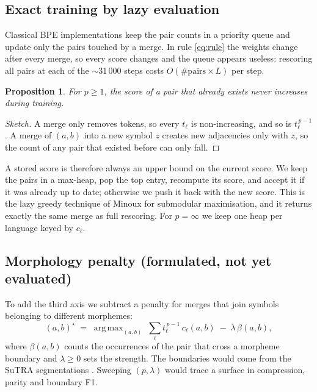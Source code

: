 \documentclass[11pt,a4paper]{article}
\newtheorem{proposition}{Proposition}
\theoremstyle{remark}
\DeclareMathOperator*{\argmax}{arg\,max}
\begin{document}
\subsection{Exact training by lazy evaluation}\label{sec:lazy}

Classical BPE implementations keep the pair counts in a priority queue and update only the
pairs touched by a merge. In rule \eqref{eq:rule} the weights change after every merge, so
every score changes and the queue appears useless: rescoring all pairs at each of the
$\sim$31\,000 steps costs $O(\#\text{pairs}\times L)$ per step.

\begin{proposition}\label{prop:lazy}
For $p\ge1$, the score of a pair that already exists never increases during training.
\end{proposition}

\begin{proof}[Sketch]
A merge only removes tokens, so every $t_\ell$ is non-increasing, and so is
$t_\ell^{\,p-1}$. A merge of $(a,b)$ into a new symbol $z$ creates new adjacencies only with
$z$, so the count of any pair that existed before can only fall.
\end{proof}

A stored score is therefore always an upper bound on the current score. We keep the pairs in
a max-heap, pop the top entry, recompute its score, and accept it if it was already
up to date; otherwise we push it back with the new score. This is the lazy greedy technique
of Minoux \cite{minoux1978} for submodular maximisation, and it returns exactly the same
merge as full rescoring. For $p=\infty$ we keep one heap per language keyed by $c_\ell$.

\subsection{Morphology penalty (formulated, not yet evaluated)}\label{sec:morph}

To add the third axis we subtract a penalty for merges that join symbols belonging to
different morphemes:
\begin{equation}\label{eq:morph}
  (a,b)^\star \;=\; \argmax_{(a,b)}\; \sum_{\ell} t_\ell^{\,p-1}\, c_\ell(a,b) \;-\; \lambda\,\beta(a,b),
\end{equation}
where $\beta(a,b)$ counts the occurrences of the pair that cross a morpheme boundary and
$\lambda\ge0$ sets the strength. The boundaries would come from the SuTRA
segmentations \cite{rathore2026}. Sweeping $(p,\lambda)$ would trace a surface in
compression, parity and boundary F1.
\end{document}
